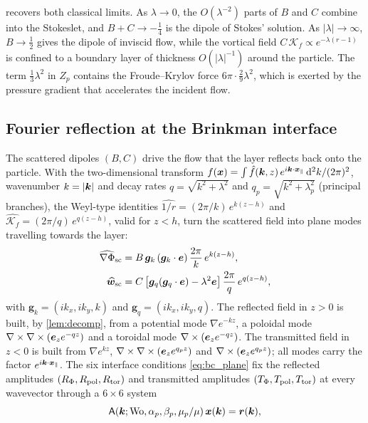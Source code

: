  recovers both classical limits. As $\lambda\to0$, the $O(\lambda^{-2})$ parts of $B$ and $C$ combine
into the Stokeslet, and $B+C\to-\tfrac14$ is the dipole of Stokes' solution. As $|\lambda|\to\infty$, $B\to\tfrac12$
gives the dipole of inviscid flow, while the vortical field $C\,\mathcal K_f\propto e^{-\lambda(r-1)}$ is confined to a
boundary layer of thickness $O(|\lambda|^{-1})$ around the particle. The term $\tfrac13\lambda^2$ in $Z_p$ contains the
Froude--Krylov force $6\pi\cdot\tfrac29\lambda^2$, which is exerted by the pressure gradient that accelerates the incident
flow.

\subsection{Fourier reflection at the Brinkman interface}\label{sec:reflection}
The scattered dipoles $(B,C)$ drive the flow that the layer reflects back onto the particle. With the two-dimensional
transform $f(\bm{x})=\int\hat f(\bm{k},z)\,e^{i\bm{k}\cdot\bm{x}_\parallel}\,\mathrm{d}^2k/(2\pi)^2$, wavenumber $k=|\bm{k}|$ and decay rates
$q=\sqrt{k^2+\lambda^2}$ and $q_p=\sqrt{k^2+\lambda_p^2}$ (principal branches), the Weyl-type identities
$\widehat{1/r}=(2\pi/k)\,e^{k(z-h)}$ and $\widehat{\mathcal K_f}=(2\pi/q)\,e^{q(z-h)}$, valid for $z<h$, turn the
scattered field into plane modes travelling towards the layer:
\begin{subequations}\label{eq:incident_fourier}
\begin{align}
  \widehat{\nabla\Phi}_{\rm sc}&=B\,\bm g_k\,(\bm g_k\cdot\bm{e})\,\frac{2\pi}{k}\,e^{k(z-h)},\\
  \widehat{\bm w}_{\rm sc}&=C\left[\bm g_q(\bm g_q\cdot\bm{e})-\lambda^2\bm{e}\right]\frac{2\pi}{q}\,e^{q(z-h)},
\end{align}
\end{subequations}
with $\bm g_k=(ik_x,ik_y,k)$ and $\bm g_q=(ik_x,ik_y,q)$. The reflected field in $z>0$ is built, by \cref{lem:decomp},
from a potential mode $\nabla e^{-kz}$, a poloidal mode $\nabla\times\nabla\times(\bm{e}_ze^{-qz})$ and a toroidal mode
$\nabla\times(\bm{e}_ze^{-qz})$. The transmitted field in $z<0$ is built from $\nabla e^{kz}$, $\nabla\times\nabla\times(\bm{e}_ze^{q_pz})$ and
$\nabla\times(\bm{e}_ze^{q_pz})$; all modes carry the factor $e^{i\bm{k}\cdot\bm{x}_\parallel}$. The six interface conditions
\eqref{eq:bc_plane} fix the reflected amplitudes $(R_\Phi,R_{\rm pol},R_{\rm tor})$ and transmitted amplitudes
$(T_\Phi,T_{\rm pol},T_{\rm tor})$ at every wavevector through a $6\times6$ system
\begin{equation}
  \mathsf A(\bm{k};\mathrm{Wo},\alpha_p,\beta_p,\mu_p/\mu)\,\bm x(\bm{k})=\bm r(\bm{k}),
  \label{eq:interface_system}
\end{equation}
